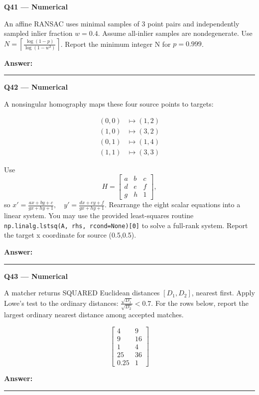 \documentclass[11pt,a4paper]{article}
\begin{document}
\par\vspace{12pt}
\begin{minipage}{\linewidth}
\textbf{Q41 — Numerical}\par\smallskip
An affine RANSAC uses minimal samples of 3 point pairs and independently sampled inlier fraction \(w=0.4\). Assume all-inlier samples are nondegenerate. Use \(N=\left\lceil\frac{\log(1-p)}{\log(1-w^3)}\right\rceil\). Report the minimum integer N for \(p=0.999\).
\par\medskip\textbf{Answer:} \rule{55mm}{0.4pt}
\end{minipage}
\par\vspace{12pt}
\begin{minipage}{\linewidth}
\textbf{Q42 — Numerical}\par\smallskip
A nonsingular homography maps these four source points to targets:


\[
\begin{aligned}(0,0)&\mapsto (1,2)\\(1,0)&\mapsto (3,2)\\(0,1)&\mapsto (1,4)\\(1,1)&\mapsto (3,3)\end{aligned}
\]


Use
\[H=\begin{bmatrix}a&b&c\\d&e&f\\g&h&1\end{bmatrix},\]
 so \(x'=\frac{ax+by+c}{gx+hy+1},\quad y'=\frac{dx+ey+f}{gx+hy+1}\). Rearrange the eight scalar equations into a linear system. You may use the provided least-squares routine \texttt{np.linalg.lstsq(A,\allowbreak{} rhs,\allowbreak{} rcond=\allowbreak{}None)[0]} to solve a full-rank system. Report the target x coordinate for source (0.5,\allowbreak{}0.5).
\par\medskip\textbf{Answer:} \rule{55mm}{0.4pt}
\end{minipage}
\par\vspace{12pt}
\begin{minipage}{\linewidth}
\textbf{Q43 — Numerical}\par\smallskip
A matcher returns SQUARED Euclidean distances \([D_1,D_2]\),\allowbreak{} nearest first. Apply Lowe's test to the ordinary distances: \(\frac{\sqrt{D_1}}{\sqrt{D_2}}<0.7\). For the rows below,\allowbreak{} report the largest ordinary nearest distance among accepted matches.


\[
\begin{bmatrix}4&9\\9&16\\1&4\\25&36\\0.25&1\end{bmatrix}
\]

\par\medskip\textbf{Answer:} \rule{55mm}{0.4pt}
\end{minipage}
\end{document}
